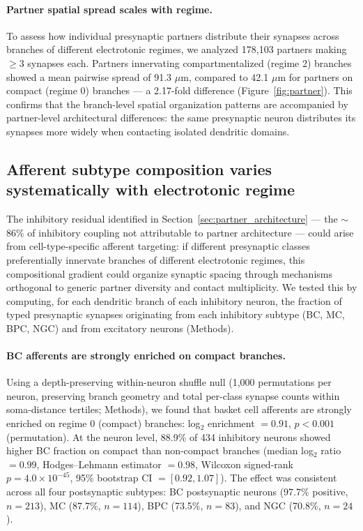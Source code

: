 \documentclass[11pt]{article}
\begin{document}
\paragraph{Partner spatial spread scales with regime.} \label{sec:partner} To assess how individual presynaptic partners distribute their synapses across branches of different electrotonic regimes, we analyzed 178,103 partners making $\geq 3$ synapses each. Partners innervating compartmentalized (regime 2) branches showed a mean pairwise spread of 91.3 $\mu$m, compared to 42.1 $\mu$m for partners on compact (regime 0) branches --- a 2.17-fold difference (Figure~\ref{fig:partner}). This confirms that the branch-level spatial organization patterns are accompanied by partner-level architectural differences: the same presynaptic neuron distributes its synapses more widely when contacting isolated dendritic domains.


\subsection{Afferent subtype composition varies systematically with electrotonic regime}
\label{sec:afferent_targeting}

The inhibitory residual identified in Section~\ref{sec:partner_architecture} --- the $\sim$86\% of inhibitory coupling not attributable to partner architecture --- could arise from cell-type-specific afferent targeting: if different presynaptic classes preferentially innervate branches of different electrotonic regimes, this compositional gradient could organize synaptic spacing through mechanisms orthogonal to generic partner diversity and contact multiplicity. We tested this by computing, for each dendritic branch of each inhibitory neuron, the fraction of typed presynaptic synapses originating from each inhibitory subtype (BC, MC, BPC, NGC) and from excitatory neurons (Methods).

\paragraph{BC afferents are strongly enriched on compact branches.} Using a depth-preserving within-neuron shuffle null (1,000 permutations per neuron, preserving branch geometry and total per-class synapse counts within soma-distance tertiles; Methods), we found that basket cell afferents are strongly enriched on regime 0 (compact) branches: log$_2$ enrichment $= 0.91$, $p < 0.001$ (permutation). At the neuron level, 88.9\% of 434 inhibitory neurons showed higher BC fraction on compact than non-compact branches (median log$_2$ ratio $= 0.99$, Hodges--Lehmann estimator $= 0.98$, Wilcoxon signed-rank $p = 4.0 \times 10^{-45}$, 95\% bootstrap CI $= [0.92, 1.07]$). The effect was consistent across all four postsynaptic subtypes: BC postsynaptic neurons (97.7\% positive, $n = 213$), MC (87.7\%, $n = 114$), BPC (73.5\%, $n = 83$), and NGC (70.8\%, $n = 24$).
\end{document}
